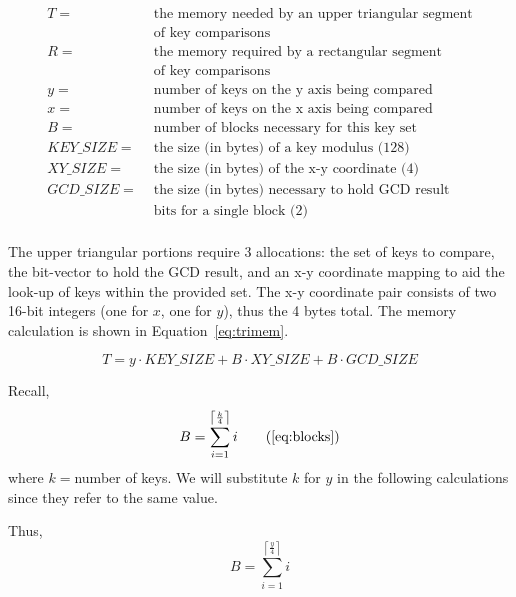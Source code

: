 \documentclass[smallextended]{svjour3}       %
\begin{document}
\begin{displaymath}
   \begin{split}
   T = & \mbox{ the memory needed by an upper triangular segment}\\
       & \mbox{ of key comparisons}\\
   R = & \mbox{ the memory required by a rectangular segment}\\
       & \mbox{ of key comparisons}\\
   y = & \mbox{ number of keys on the y axis being compared}\\
   x = & \mbox{ number of keys on the x axis being compared}\\
   B = & \mbox{ number of blocks necessary for this key set}\\
   KEY\_SIZE = & \mbox{ the size (in bytes) of a key modulus (128)}\\
   XY\_SIZE = & \mbox{ the size (in bytes) of the x-y coordinate (4)}\\
   GCD\_SIZE = & \mbox{ the size (in bytes) necessary to hold GCD result}\\
               & \mbox{ bits for a single block (2)}\\
   \end{split}
\end{displaymath}

The upper triangular portions require 3 allocations: the set of keys to compare, the bit-vector to hold the GCD result, and an x-y coordinate mapping to aid the look-up of keys within the provided set. The x-y coordinate pair consists of two 16-bit integers (one for $x$, one for $y$), thus the 4 bytes total. The memory calculation is shown in Equation~\ref{eq:trimem}.

\begin{equation}
   T = y \cdot KEY\_SIZE + B \cdot XY\_SIZE + B \cdot GCD\_SIZE
   \label{eq:trimem}
\end{equation}

\noindent Recall,
\begin{equation}
   B = \sum_{i=1}^{\left\lceil \frac{k}{4} \right\rceil}i
   \tag{\ref{eq:blocks}}
\end{equation}
where $k = $number of keys. We will substitute $k$ for $y$ in the following calculations since they refer to the same value.

\noindent Thus,
\begin{equation}
   B = \sum_{i=1}^{\left\lceil \frac{y}{4} \right\rceil}i
   \label{eq:blocksy}
\end{equation}
\end{document}
